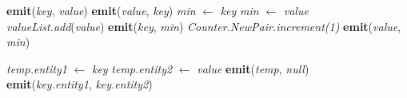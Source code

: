 \documentclass[conference]{IEEEtran}
\begin{document}
\begin{minipage}[t]{0.48\textwidth} %
\tiny %
\begin{algorithm}[H]
\caption{CCF-Iterate}
\label{alg:ccf_iterate}
\begin{algorithmic}[1]
        \State \textbf{emit}(\textit{key}, \textit{value})
        \State \textbf{emit}(\textit{value}, \textit{key})
    \EndFunction
        \State \textit{min} $\gets$ \textit{key}
                \State \textit{min} $\gets$ \textit{value}
            \EndIf
            \State \textit{valueList.add}(\textit{value})
        \EndFor
            \State \textbf{emit}(\textit{key}, \textit{min})
                    \State \textit{Counter.NewPair.increment(1)}
                    \State \textbf{emit}(\textit{value}, \textit{min})
                \EndIf
            \EndFor
        \EndIf
    \EndFunction
\end{algorithmic}
\end{algorithm}
\end{minipage}
\hfill
\begin{minipage}[t]{0.48\textwidth} %
\tiny %
\begin{algorithm}[H]
\caption{CCF-Dedup}
\label{alg:ccf_dedup}
\begin{algorithmic}[1]
        \State \textit{temp.entity1} $\gets$ \textit{key}
        \State \textit{temp.entity2} $\gets$ \textit{value}
        \State \textbf{emit}(\textit{temp}, \textit{null})
    \EndFunction
    \\
        \State \textbf{emit}(\textit{key.entity1}, \textit{key.entity2})
    \EndFunction
\end{algorithmic}
\end{algorithm}
\end{minipage}

\balance %

\newpage
\end{document}
